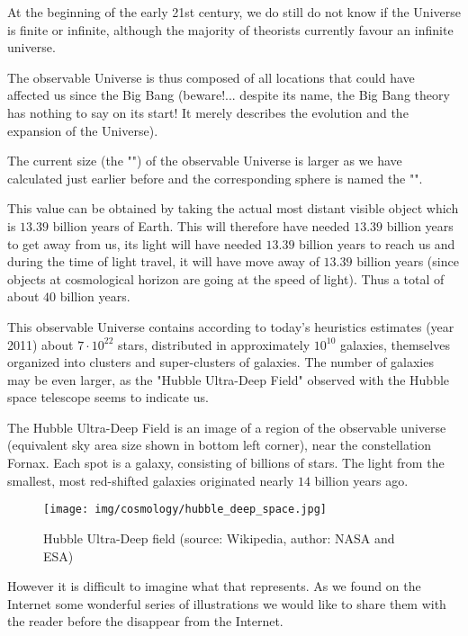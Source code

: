 	At the beginning of the early 21st century, we do still do not know if the Universe is finite or infinite, although the majority of theorists currently favour an infinite universe.

	The observable Universe is thus composed of all locations that could have affected us since the Big Bang (beware!... despite its name, the Big Bang theory has nothing to say on its start! It merely describes the evolution and the expansion of the Universe).

	The current size (the "") of the observable Universe is larger as we have calculated just earlier before and the corresponding sphere is named the "".

	This value can be obtained by taking the actual most distant visible object which is $13.39$ billion years of Earth. This will therefore have needed $13.39$ billion years to get away from us, its light will have needed $13.39$ billion years to reach us and during the time of light travel, it will have move away of $13.39$ billion years (since objects at cosmological horizon are going at the speed of light). Thus a total of about $40$ billion years.
	
	This observable Universe contains according to today's heuristics  estimates (year 2011) about $7\cdot 10^{22}$ stars, distributed in approximately $10^{10}$ galaxies, themselves organized into clusters and super-clusters of galaxies. The number of galaxies may be even larger, as the "Hubble Ultra-Deep Field" observed with the Hubble space telescope seems to indicate us. 
	
	The Hubble Ultra-Deep Field is an image of a region of the observable universe (equivalent sky area size shown in bottom left corner), near the constellation Fornax. Each spot is a galaxy, consisting of billions of stars. The light from the smallest, most red-shifted galaxies originated nearly $14$ billion years ago.
	\begin{figure}[H]
		\centering
		\texttt{[image: img/cosmology/hubble\_deep\_space.jpg]}
		\caption[Hubble Ultra-Deep field]{Hubble Ultra-Deep field (source: Wikipedia, author: NASA and ESA)}
	\end{figure}
	However it is difficult to imagine what that represents. As we found on the Internet some wonderful series of illustrations we would like to share them with the reader before the disappear from the Internet.

